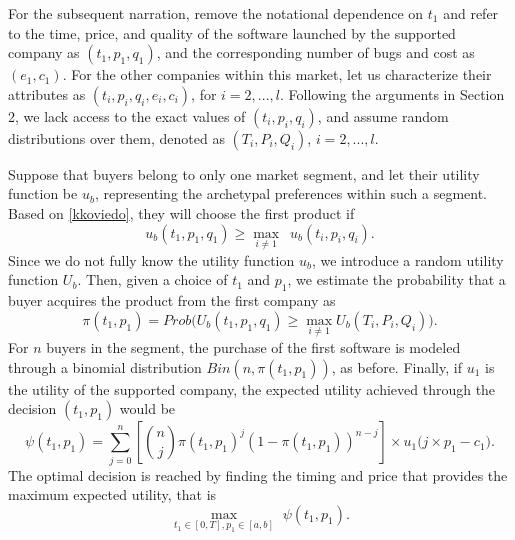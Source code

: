 \documentclass[a4paper,fleqn, 11pt]{cas-sc}
\begin{document}
\noindent
For the subsequent narration, remove the notational dependence on $t_1$ and refer to the time, price, and quality of the software launched by the supported company as $(t_1, p_1, q_1)$, and the corresponding number of bugs and cost as $(e_1, c_1)$. 
For the other companies within this market,
 let us characterize their attributes as
  $(t_i, p_i, q_i, e_i, c_i)$, for $i=2,...,l$. Following the arguments in Section 2, %
  we lack access to the exact values of $(t_i, p_i, q_i)$, and assume random distributions over them, denoted as 
 $(T_i, P_i, Q_i)$, $i=2,...,l$.

  Suppose that buyers belong to only one market segment,  
  and let their utility function be $u_b$, representing the archetypal preferences within such a segment. Based on
  \eqref{kkoviedo}, 
they  will choose the first product if 
\begin{equation*}
     u_b(t_1, p_1, q_1) \geq \max_{i \neq 1} \,\,\, u_b(t_i, p_i, q_i).
\end{equation*}
 Since we do not fully know the utility function $u_b$, %
we introduce a random utility function $U_b$. Then, given a choice of 
 $t_1$ and $p_1$, we estimate the probability that a buyer 
acquires the product from the first company as    
\begin{equation*}
    \pi(t_1, p_1 ) = Prob \big( U_b(t_1, p_1, q_1) \geq \max_{i\neq 1}  U_b(T_i, P_i, Q_i) \big).
\end{equation*}
For $n$ buyers in the segment, the purchase of the first software is modeled through a binomial distribution
 $Bin(n, \pi(t_1, p_1))$, as before. 
Finally, if $u_1$ is the  utility of the supported company,
the expected utility achieved through the decision $(t_1,p_1)$ 
 would be 
\begin{equation}\label{kkbaiuca}
    \psi(t_1, p_1) = \sum_{j=0}^n  \left[ \binom{n}{j} \pi(t_1,p_1)^j (1-\pi(t_1,p_1))^{n-j} \right] \times u_1\big(j \times  p_1  - c_1  \big).
\end{equation}
The optimal decision is reached by finding the timing and price that provides the maximum expected utility, that is  
\begin{equation}
\max_{t_1\in [0,T], p_1\in [a, b]} \,\, \psi(t_1, p_1).
\label{max_software}
\end{equation} 
\end{document}
